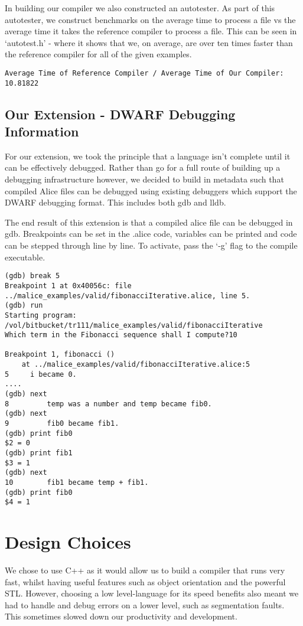 \documentclass[a4wide, 11pt]{article}
\begin{document}
In building our compiler we also constructed an autotester. As part of this autotester, we construct benchmarks on the average time to process a file vs the average time it takes the reference compiler to process a file. This can be seen in `autotest.h' - where it shows that we, on average, are over ten times faster than the reference compiler for all of the given examples.
\begin{verbatim}
Average Time of Reference Compiler / Average Time of Our Compiler: 10.81822
\end{verbatim}

\subsection{Our Extension - DWARF Debugging Information}

For our extension, we took the principle that a language isn't complete until it can be effectively debugged. Rather than go for a full route of building up a debugging infrastructure however, we decided to build in metadata such that compiled Alice files can be debugged using existing debuggers which support the DWARF debugging format. This includes both gdb and lldb.

The end result of this extension is that a compiled alice file can be debugged in gdb. Breakpoints can be set in the .alice code, variables can be printed and code can be stepped through line by line. To activate, pass the `-g' flag to the compile executable.

\begin{verbatim}
(gdb) break 5
Breakpoint 1 at 0x40056c: file ../malice_examples/valid/fibonacciIterative.alice, line 5.
(gdb) run
Starting program: /vol/bitbucket/tr111/malice_examples/valid/fibonacciIterative 
Which term in the Fibonacci sequence shall I compute?10

Breakpoint 1, fibonacci ()
    at ../malice_examples/valid/fibonacciIterative.alice:5
5     i became 0.
....
(gdb) next
8         temp was a number and temp became fib0.
(gdb) next
9         fib0 became fib1.
(gdb) print fib0
$2 = 0
(gdb) print fib1
$3 = 1
(gdb) next
10        fib1 became temp + fib1.
(gdb) print fib0
$4 = 1
\end{verbatim}

\section{Design Choices}

We chose to use C++ as it would allow us to build a compiler that runs very fast, whilst having useful features such as object orientation and the powerful STL. However, choosing a low level-language for its speed benefits also meant we had to handle and debug errors on a lower level, such as segmentation faults. This sometimes slowed down our productivity and development.
\end{document}
